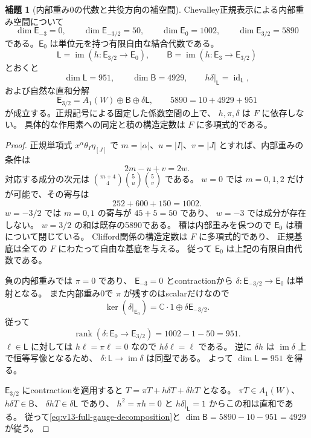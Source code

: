 \documentclass[a4paper,11pt]{ltjsarticle}
\theoremstyle{definition}
\newtheorem{lemma}[theorem]{補題}
\newcommand{\CC}{\mathbb C}
\begin{document}
\begin{lemma}[内部重み0の代数と共役方向の補空間]
\label{lem:v13-gauge-weight-spaces}
Chevalley正規表示による内部重み空間について
\[
 \dim\mathsf E_{-3}=0,\qquad
 \dim\mathsf E_{-3/2}=50,\qquad
 \dim\mathsf E_0=1002,\qquad
 \dim\mathsf E_{3/2}=5890
\]
である。$\mathsf E_0$ は単位元を持つ有限自由な結合代数である。
\[
 \mathsf L=\operatorname{im}
       (h:\mathsf E_{3/2}\longrightarrow\mathsf E_0),\qquad
 \mathsf B=\operatorname{im}
       (h:\mathsf E_3\longrightarrow\mathsf E_{3/2})
\]
とおくと
\[
 \dim\mathsf L=951,\qquad \dim\mathsf B=4929,
 \qquad h\delta|_{\mathsf L}=\operatorname{id}_{\mathsf L},
\]
および自然な直和分解
\begin{equation}\label{eq:v13-full-gauge-decomposition}
 \mathsf E_{3/2}
 =A_1(W)\oplus\mathsf B\oplus\delta\mathsf L,
 \qquad 5890=10+4929+951
\end{equation}
が成立する。正規記号による固定した係数空間の上で、
$h,\pi,\delta$ は $F$ に依存しない。
具体的な作用素への同定と積の構造定数は $F$ に多項式的である。
\end{lemma}
\begin{proof}
正規単項式 $x^\alpha\theta_I\eta_{[J]}$ で
$m=|\alpha|$、$u=|I|$、$v=|J|$ とすれば、内部重みの条件は
\[
 2m-u+v=2w.
\]
対応する成分の次元は
$\binom{m+4}{4}\binom5u\binom5v$ である。
$w=0$ では $m=0,1,2$ だけが可能で、その寄与は
\[
 252+600+150=1002.
\]
$w=-3/2$ では $m=0,1$ の寄与が $45+5=50$ であり、
$w=-3$ では成分が存在しない。
$w=3/2$ の和は既存の5890である。
積は内部重みを保つので $\mathsf E_0$ は積について閉じている。
Clifford関係の構造定数は $F$ に多項式的であり、
正規基底は全ての $F$ にわたって自由な基底を与える。
従って $\mathsf E_0$ は上記の有限自由代数である。

負の内部重みでは $\pi=0$ であり、
$\mathsf E_{-3}=0$ とcontractionから
$\delta:\mathsf E_{-3/2}\to\mathsf E_0$ は単射となる。
また内部重み0で $\pi$ が残すのはscalarだけなので
\[
 \ker(\delta|_{\mathsf E_0})
 =\CC\cdot1\oplus\delta\mathsf E_{-3/2}.
\]
従って
\[
 \operatorname{rank}(\delta:\mathsf E_0\to\mathsf E_{3/2})
 =1002-1-50=951.
\]
$\ell\in\mathsf L$ に対しては $h\ell=\pi\ell=0$ なので
$h\delta\ell=\ell$ である。
逆に $\delta h$ は $\operatorname{im}\delta$ 上で恒等写像となるため、
$\delta:\mathsf L\to\operatorname{im}\delta$ は同型である。
よって $\dim\mathsf L=951$ を得る。

$\mathsf E_{3/2}$ にcontractionを適用すると
$T=\pi T+h\delta T+\delta hT$ となる。
$\pi T\in A_1(W)$、$h\delta T\in\mathsf B$、
$\delta hT\in\delta\mathsf L$ であり、
$h^2=\pi h=0$ と $h\delta|_{\mathsf L}=1$ からこの和は直和である。
従って\eqref{eq:v13-full-gauge-decomposition}と
$\dim\mathsf B=5890-10-951=4929$ が従う。
\end{proof}
\end{document}
